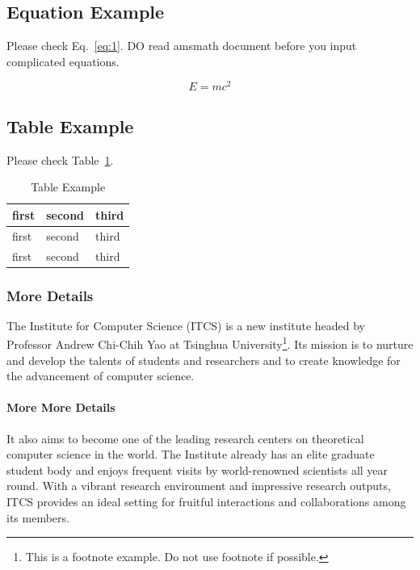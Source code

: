 \documentclass{ics}
\begin{document}
\subsection{Equation Example}
\label{sec:equation-example}
Please check Eq.~\eqref{eq:1}. DO read \textsf{amsmath} document before you
input complicated equations.

\begin{equation}
  \label{eq:1}
  E=mc^{2}
\end{equation}

\subsection{Table Example}
\label{sec:more-more-details-1}
Please check Table~\ref{tab:example}.

\begin{table}[h]
  \centering
  \caption{Table Example}
  \label{tab:example}
  \begin{tabular}{l|l|l}
    \hline
    first & second & third \\
    \hline
    first & second & third \\
    \hline
    first & second & third \\
    \hline
  \end{tabular}
\end{table}

\subsubsection{More Details}
\label{sec:more-details}
The Institute for Computer Science (ITCS) is a new institute headed by Professor
Andrew Chi-Chih Yao at Tsinghua University\footnote{This is a footnote
  example. Do not use footnote if possible.}. Its mission is to nurture and
develop the talents of students and researchers and to create knowledge for the
advancement of computer science.

\paragraph{More More Details}
\label{sec:more-more-details}
It also aims to become one of the leading research centers on theoretical
computer science in the world. The Institute already has an elite graduate
student body and enjoys frequent visits by world-renowned scientists all year
round. With a vibrant research environment and impressive research outputs, ITCS
provides an ideal setting for fruitful interactions and collaborations among its
members.
\end{document}
